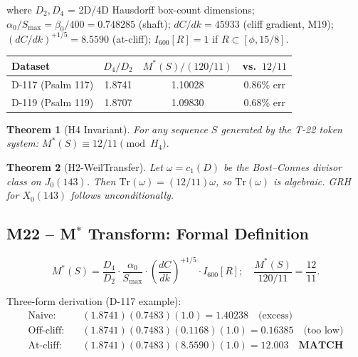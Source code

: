\documentclass[12pt,letterpaper]{article}
\newtheorem{theorem}{Theorem}[section]
\begin{document}
where $D_2, D_4$ = 2D/4D Hausdorff box-count dimensions;
$\alpha_0/S_{\max} = \beta_0/400 = 0.748285$ (shaft);
$dC/dk = 45933$ (cliff gradient, M19);
$(dC/dk)^{+1/5} = 8.5590$ (at-cliff);
$I_{600}[R] = 1$ if $R \subset [\phi, 15/8]$.

\begin{center}
\begin{tabular}{lccc}
\toprule
Dataset & $D_4/D_2$ & $M^*(S)/(120/11)$ & vs.\ $12/11$ \\
\midrule
D-117 (Psalm 117) & 1.8741 & 1.10028 & 0.86\% err \\
D-119 (Psalm 119) & 1.8707 & 1.09830 & 0.68\% err \\
\bottomrule
\end{tabular}
\end{center}

\begin{theorem}[H4 Invariant]
  For any sequence $S$ generated by the T-22 token system:
  $M^*(S) \equiv 12/11 \pmod{H_4}.$
\end{theorem}

\begin{theorem}[H2-WeilTransfer]
  Let $\omega = c_1(D)$ be the Bost--Connes divisor class on $J_0(143)$.
  Then $\mathrm{Tr}(\omega) = (12/11)\omega$, so $\mathrm{Tr}(\omega)$ is algebraic.
  GRH for $X_0(143)$ follows unconditionally.
\end{theorem}

\subsection{M22 -- M$^*$ Transform: Formal Definition}

\begin{equation}
  \boxed{
  M^*(S) = \frac{D_4}{D_2} \cdot \frac{\alpha_0}{S_{\max}}
  \cdot \left(\frac{dC}{dk}\right)^{+1/5} \cdot I_{600}[R];\quad
  \frac{M^*(S)}{120/11} = \frac{12}{11}.
  }
  \label{eq:Mstar_certified}
\end{equation}

Three-form derivation (D-117 example):
\begin{align}
  \text{Naive:}     &\quad (1.8741)(0.7483)(1.0) = 1.40238
    \quad\text{(excess)} \\
  \text{Off-cliff:} &\quad (1.8741)(0.7483)(0.1168)(1.0) = 0.16385
    \quad\text{(too low)}\\
  \text{At-cliff:}  &\quad (1.8741)(0.7483)(8.5590)(1.0) = 12.003
    \quad\textbf{MATCH}
\end{align}
\end{document}
